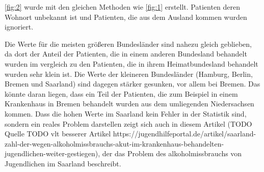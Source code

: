\documentclass{article}
\begin{document}
\ref{fig:2} wurde mit den gleichen Methoden wie \ref{fig:1} erstellt. Patienten deren Wohnort unbekannt ist und Patienten, die aus dem Ausland kommen wurden ignoriert. 

Die Werte für die meisten größeren Bundesländer sind nahezu gleich geblieben, da dort der Anteil der Patienten, die in einem anderen Bundesland behandelt wurden im vergleich zu den Patienten, die in ihrem Heimatbundesland behandelt wurden sehr klein ist. Die Werte der kleineren Bundesländer (Hamburg, Berlin, Bremen und Saarland) sind dagegen stärker gesunken, vor allem bei Bremen. Das könnte daran liegen, dass ein Teil der Patienten, die zum Beispiel in einem Krankenhaus in Bremen behandelt wurden aus dem umliegenden Niedersachsen kommen. Dass die hohen Werte im Saarland kein Fehler in der Statistik sind, sondern ein reales Problem darstellen zeigt sich auch in diesem Artikel (TODO Quelle TODO vlt besserer Artikel https://jugendhilfeportal.de/artikel/saarland-zahl-der-wegen-alkoholmissbrauchs-akut-im-krankenhaus-behandelten-jugendlichen-weiter-gestiegen), der das Problem des alkoholmissbrauchs von Jugendlichen im Saarland beschreibt. 
\end{document}
